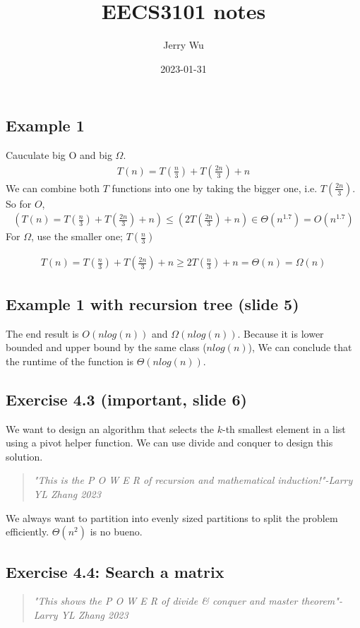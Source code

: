 \documentclass[12pt]{article}
\title{EECS3101 notes}
\author{Jerry Wu}
\date{2023-01-31}
\begin{document}
    \maketitle

    \subsection*{Example 1}
    Cauculate big O and big $\Omega$.
    \begin{align*}
        T(n)=T(\frac{n}{3})+T(\frac{2n}{3})+n
    \end{align*}
    We can combine both $T$ functions into one by taking the bigger one, i.e. $T(\frac{2n}{3})$. So for $O$,
    \begin{align*}
        (T(n)=T(\frac{n}{3})+T(\frac{2n}{3})+n)\leq (2T(\frac{2n}{3})+n)\in \Theta(n^{1.7})=O(n^{1.7})
    \end{align*}
    For $\Omega$, use the smaller one; $T(\frac{n}{3})$

    \begin{align*}
        T(n)=T(\frac{n}{3})+T(\frac{2n}{3})+n\geq 2T(\frac{n}{3})+n=\Theta(n)=\Omega(n)
    \end{align*}

    \subsection*{Example 1 with recursion tree (slide 5)}
    The end result is $O(nlog(n))$ and $\Omega(nlog(n))$. Because it is lower bounded and upper bound by the same class ($nlog(n)$), We can conclude that the runtime of the function is $\Theta(nlog(n))$.

    \subsection*{Exercise 4.3 (important, slide 6)}
    We want to design an algorithm that selects the $k$-th smallest element in a list using a pivot helper function. We can use divide and conquer to design this solution.
    
    \begin{quote}
        \textit{"This is the P O W E R of recursion and mathematical induction!"-Larry YL Zhang 2023}
    \end{quote}

    We always want to partition into evenly sized partitions to split the problem efficiently. $\Theta(n^2)$ is no bueno.

    \subsection*{Exercise 4.4: Search a matrix}
    \begin{quote}
        \textit{"This shows the P O W E R of divide \& conquer and master theorem"-Larry YL Zhang 2023}
    \end{quote}
\end{document}
